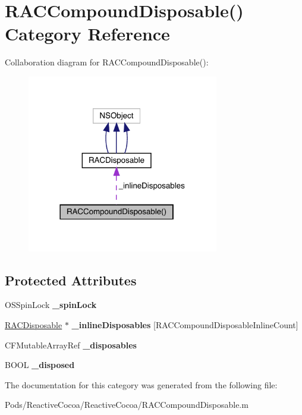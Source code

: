 \hypertarget{category_r_a_c_compound_disposable_07_08}{}\section{R\+A\+C\+Compound\+Disposable() Category Reference}
\label{category_r_a_c_compound_disposable_07_08}


Collaboration diagram for R\+A\+C\+Compound\+Disposable()\+:\nopagebreak
\begin{figure}[H]
\begin{center}
\leavevmode
\includegraphics[width=237pt]{category_r_a_c_compound_disposable_07_08__coll__graph}
\end{center}
\end{figure}
\subsection*{Protected Attributes}
\begin{DoxyCompactItemize}
\item 
\mbox{\label{category_r_a_c_compound_disposable_07_08_aa5167e643f35da907437564f98966b56}} 
O\+S\+Spin\+Lock {\bfseries \+\_\+spin\+Lock}
\item 
\mbox{\label{category_r_a_c_compound_disposable_07_08_a54346649690a567257dfd53cbbb4f541}} 
\mbox{\hyperlink{interface_r_a_c_disposable}{R\+A\+C\+Disposable}} $\ast$ {\bfseries \+\_\+inline\+Disposables} \mbox{[}R\+A\+C\+Compound\+Disposable\+Inline\+Count\mbox{]}
\item 
\mbox{\label{category_r_a_c_compound_disposable_07_08_af8f670123d3b119326f0eef97aba3e65}} 
C\+F\+Mutable\+Array\+Ref {\bfseries \+\_\+disposables}
\item 
\mbox{\label{category_r_a_c_compound_disposable_07_08_aec1b0dfe69c402fc98ab0e5c0ae7c7b2}} 
B\+O\+OL {\bfseries \+\_\+disposed}
\end{DoxyCompactItemize}


The documentation for this category was generated from the following file\+:\begin{DoxyCompactItemize}
\item 
Pods/\+Reactive\+Cocoa/\+Reactive\+Cocoa/R\+A\+C\+Compound\+Disposable.\+m\end{DoxyCompactItemize}
